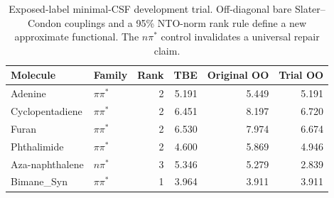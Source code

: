 \begin{table}[!htbp]
\centering\small
\caption{Exposed-label minimal-CSF development trial. Off-diagonal bare Slater--Condon couplings and a 95\% NTO-norm rank rule define a new approximate functional. The $n\pi^*$ control invalidates a universal repair claim.}\label{tab:multicsfdev}
\begin{tabular}{llrrrr}
\toprule
Molecule & Family & Rank & TBE & Original OO & Trial OO \\
\midrule
Adenine & $\pi\pi^*$ & 2 & 5.191 & 5.449 & 5.191 \\
Cyclopentadiene & $\pi\pi^*$ & 2 & 6.451 & 8.197 & 6.720 \\
Furan & $\pi\pi^*$ & 2 & 6.530 & 7.974 & 6.674 \\
Phthalimide & $\pi\pi^*$ & 2 & 4.600 & 5.869 & 4.946 \\
Aza-naphthalene & $n\pi^*$ & 3 & 5.346 & 5.279 & 2.839 \\
Bimane\_Syn & $\pi\pi^*$ & 1 & 3.964 & 3.911 & 3.911 \\
\bottomrule
\end{tabular}
\end{table}
